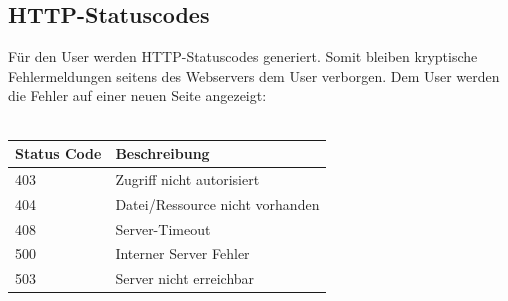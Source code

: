 	\subsection{HTTP-Statuscodes}
	Für den User werden HTTP-Statuscodes generiert. Somit bleiben kryptische Fehlermeldungen seitens des Webservers dem User verborgen. Dem User werden die Fehler auf einer neuen Seite angezeigt: \\ \\
	\begin{tabular}{|l|l|}
		\hline
		Status Code & Beschreibung \\
		\hline
		403 & Zugriff nicht autorisiert \\
		404 & Datei/Ressource nicht vorhanden \\
		408 & Server-Timeout \\
		500 & Interner Server Fehler \\
		503 & Server nicht erreichbar \\
		\hline
 	\end{tabular}		     

